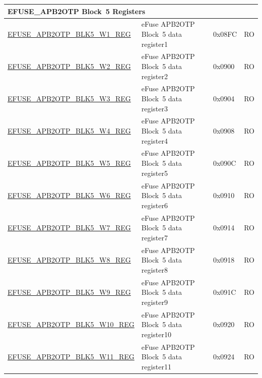 \begin{longtable}{ | p{7cm} | p{6cm} | p{1.2cm} | p{1.5cm} | }
\multicolumn{4}{|l|}{\textbf{EFUSE\_APB2OTP Block~5 Registers}} \\ \hline
\hyperref[regdesc:EFUSEAPB2OTPBLK5WNREG]{EFUSE\_APB2OTP\_BLK5\_W1\_REG} & eFuse APB2OTP Block~5 data register1 & 0x08FC & RO \\\hline
\hyperref[regdesc:EFUSEAPB2OTPBLK5WNREG]{EFUSE\_APB2OTP\_BLK5\_W2\_REG} & eFuse APB2OTP Block~5 data register2 & 0x0900 & RO \\\hline
\hyperref[regdesc:EFUSEAPB2OTPBLK5WNREG]{EFUSE\_APB2OTP\_BLK5\_W3\_REG} & eFuse APB2OTP Block~5 data register3 & 0x0904 & RO \\\hline
\hyperref[regdesc:EFUSEAPB2OTPBLK5WNREG]{EFUSE\_APB2OTP\_BLK5\_W4\_REG} & eFuse APB2OTP Block~5 data register4 & 0x0908 & RO \\\hline
\hyperref[regdesc:EFUSEAPB2OTPBLK5WNREG]{EFUSE\_APB2OTP\_BLK5\_W5\_REG} & eFuse APB2OTP Block~5 data register5 & 0x090C & RO \\\hline
\hyperref[regdesc:EFUSEAPB2OTPBLK5WNREG]{EFUSE\_APB2OTP\_BLK5\_W6\_REG} & eFuse APB2OTP Block~5 data register6 & 0x0910 & RO \\\hline
\hyperref[regdesc:EFUSEAPB2OTPBLK5WNREG]{EFUSE\_APB2OTP\_BLK5\_W7\_REG} & eFuse APB2OTP Block~5 data register7 & 0x0914 & RO \\\hline
\hyperref[regdesc:EFUSEAPB2OTPBLK5WNREG]{EFUSE\_APB2OTP\_BLK5\_W8\_REG} & eFuse APB2OTP Block~5 data register8 & 0x0918 & RO \\\hline
\hyperref[regdesc:EFUSEAPB2OTPBLK5WNREG]{EFUSE\_APB2OTP\_BLK5\_W9\_REG} & eFuse APB2OTP Block~5 data register9 & 0x091C & RO \\\hline
\hyperref[regdesc:EFUSEAPB2OTPBLK5WNREG]{EFUSE\_APB2OTP\_BLK5\_W10\_REG} & eFuse APB2OTP Block~5 data register10 & 0x0920 & RO \\\hline
\hyperref[regdesc:EFUSEAPB2OTPBLK5WNREG]{EFUSE\_APB2OTP\_BLK5\_W11\_REG} & eFuse APB2OTP Block~5 data register11 & 0x0924 & RO \\\hline


\end{longtable}
